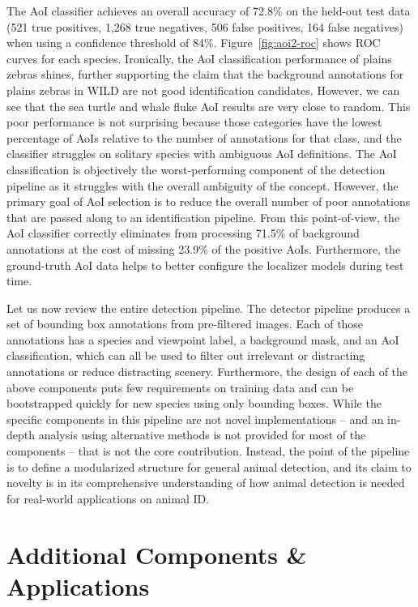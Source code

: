 The AoI classifier achieves an overall accuracy of 72.8\% on the held-out test data (521 true positives, 1,268 true negatives, 506 false positives, 164 false negatives) when using a confidence threshold of 84\%.  Figure~\ref{fig:aoi2-roc} shows ROC curves for each species.  Ironically, the AoI classification performance of plains zebras shines, further supporting the claim that the background annotations for plains zebras in WILD are not good identification candidates.  However, we can see that the sea turtle and whale fluke AoI results are very close to random.  This poor performance is not surprising because those categories have the lowest percentage of AoIs relative to the number of annotations for that class, and the classifier struggles on solitary species with ambiguous AoI definitions.  The AoI classification is objectively the worst-performing component of the detection pipeline as it struggles with the overall ambiguity of the concept.  However, the primary goal of AoI selection is to reduce the overall number of poor annotations that are passed along to an identification pipeline.  From this point-of-view, the AoI classifier correctly eliminates from processing 71.5\% of background annotations at the cost of missing 23.9\% of the positive AoIs.  Furthermore, the ground-truth AoI data helps to better configure the localizer models during test time.

Let us now review the entire detection pipeline.  The detector pipeline produces a set of bounding box annotations from pre-filtered images.  Each of those annotations has a species and viewpoint label, a background mask, and an AoI classification, which can all be used to filter out irrelevant or distracting annotations or reduce distracting scenery.  Furthermore, the design of each of the above components puts few requirements on training data and can be bootstrapped quickly for new species using only bounding boxes.  While the specific components in this pipeline are not novel implementations -- and an in-depth analysis using alternative methods is not provided for most of the components -- that is not the core contribution. Instead, the point of the pipeline is to define a modularized structure for general animal detection, and its claim to novelty is in its comprehensive understanding of how animal detection is needed for real-world applications on animal ID.

\section{Additional Components \& Applications}

